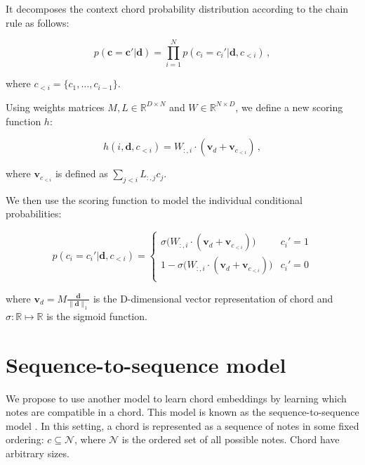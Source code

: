 \documentclass[12pt]{article}\pagestyle{myheadings}
\newcommand{\R}{\mathbb{R}}
\newcommand{\N}{\mathcal{N}}
\newcommand{\boldc}{\boldsymbol c}
\newcommand{\boldd}{\boldsymbol d}
\newcommand{\boldvd}{\boldsymbol v_d}
\newcommand{\boldvci}{\boldsymbol v_{c_{<i}}}
\begin{document}
It decomposes the context chord probability distribution according to the chain rule as follows:

\begin{equation}
p(\boldc =\boldc' | \boldd) = \prod_{i=1}^N  p(c_i =c_i'|  \boldd, c_{<i}) \,,
\end{equation} 

where $c_{<i} = \{c_1, \ldots, c_{i-1}\}$.

Using weights matrices $M, L \in \R^{D \times N}$ and $W\in \R^{N \times D}$, we define a new scoring function $h$:

\begin{equation}
h(i,\boldd,c_{<i}) =  W_{:,i} \cdot (\boldvd + \boldvci) \,,
\end{equation}

where $\boldvci$ is defined as 
$ \sum_{j<i}  L_{:,j} c_j$.

We then use the scoring function to model the individual conditional probabilities: 

\begin{equation}
p(c_i =c_i'|  \boldd, c_{<i}) = \left\{
                \begin{array}{lll}
                  \sigma\big( W_{:,i} \cdot (\boldvd + \boldvci) \big)  & c_i' = 1 \\
                  1- \sigma\big( W_{:,i} \cdot (\boldvd + \boldvci) \big)  & c_i' = 0\\
                \end{array}
              \right.
\end{equation}

where $\boldvd = M\frac{ \boldd}{\| \boldd \|_1}$ is the D-dimensional vector representation of chord and $\sigma : \mathbb{R} \mapsto \mathbb{R}$ is the sigmoid function. 


\section*{Sequence-to-sequence model}

We propose to use another model to learn chord embeddings by learning which notes are compatible in a chord. This model is known as the sequence-to-sequence model \citep{SutskeverVL14}. In this setting, a chord is represented as a sequence of notes in some fixed ordering: $c \subseteq \N$, where $\N$ is the ordered set of all possible notes. Chord have arbitrary sizes. 
\end{document}
